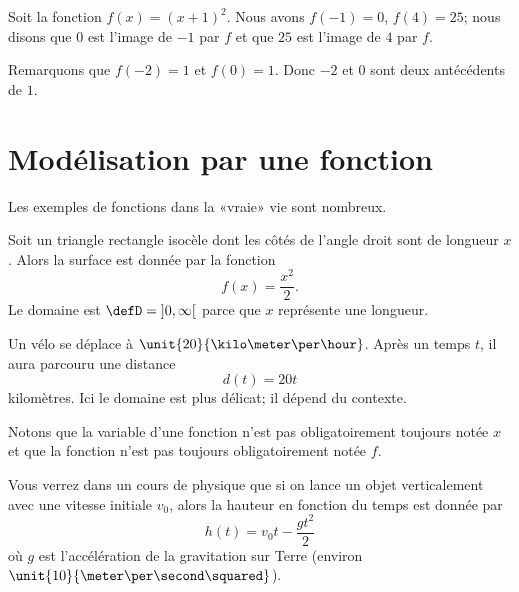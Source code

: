 \begin{example}
    Soit la fonction \( f(x)=(x+1)^2\). Nous avons \( f(-1)=0\), \( f(4)=25\); nous disons que \( 0\) est l'image de \( -1\) par \( f\) et que \( 25\) est l'image de \( 4\) par \( f\).

    Remarquons que \( f(-2)=1\) et \( f(0)=1\). Donc \( -2\) et \( 0\) sont deux antécédents de \( 1\).
\end{example}

\section{Modélisation par une fonction}

Les exemples de fonctions dans la «vraie» vie sont nombreux.

\begin{example}
    Soit un triangle rectangle isocèle dont les côtés de l'angle droit sont de longueur \( x\). Alors la surface est donnée par la fonction
    \begin{equation}
        f(x)=\frac{ x^2 }{2}.
    \end{equation}
    Le domaine est \( \defD=\mathopen] 0 , \infty \mathclose[\) parce que \( x\) représente une longueur.
\end{example}

\begin{example}
    Un vélo se déplace à \( \unit{20}{\kilo\meter\per\hour}\). Après un temps \( t\), il aura parcouru une distance
    \begin{equation}
        d(t)=20t
    \end{equation}
    kilomètres. Ici le domaine est plus délicat; il dépend du contexte.

    Notons que la variable d'une fonction n'est pas obligatoirement toujours notée \( x\) et que la fonction n'est pas toujours obligatoirement notée \( f\).
\end{example}

\begin{example}
    Vous verrez dans un cours de physique que si on lance un objet verticalement avec une vitesse initiale \( v_0\), alors la hauteur en fonction du temps est donnée par
    \begin{equation}
        h(t)=v_0t-\frac{ gt^2 }{2}
    \end{equation}
    où \( g\) est l'accélération de la gravitation sur Terre (environ \( \unit{10}{\meter\per\second\squared}\)).
\end{example}

